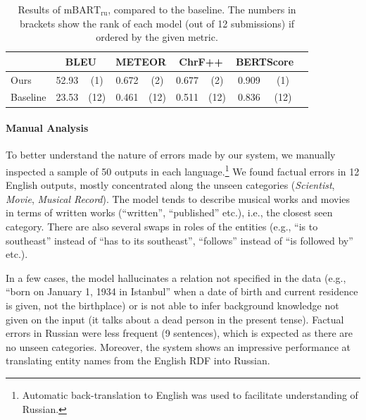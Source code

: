 \begin{table}[t]
    \footnotesize\centering
    \begin{tabular}{llcccccccc}\toprule
                 & \multicolumn{2}{c}{\bf BLEU} & \multicolumn{2}{c}{\bf METEOR} & \multicolumn{2}{c}{\bf ChrF++} & \multicolumn{2}{c}{\bf BERTScore}                               \\\midrule
        Ours     & 52.93                        & (1)                            & 0.672                          & (2)                               & 0.677 & (2)  & 0.909 & (1)  \\
        Baseline & 23.53                        & (12)                           & 0.461                          & (12)                              & 0.511 & (12) & 0.836 & (12) \\\bottomrule
    \end{tabular}
    \caption{Results of $\text{mBART}_{\text{ru}}$, compared to the baseline. The numbers in brackets show the rank of each model (out of 12 submissions) if ordered by the given metric.}
    \label{tab:mbart:results-ru}
\end{table}

\paragraph{Manual Analysis}
To better understand the nature of errors made by our system, we manually inspected a sample of 50 outputs in each language.\footnote{Automatic back-translation to English was used to facilitate understanding of Russian.} We found factual errors in 12 English outputs, mostly concentrated along the unseen categories (\emph{Scientist}, \emph{Movie}, \emph{Musical Record}). The model tends to describe musical works and movies in terms of written works (“written”, “published” etc.), i.e., the closest seen category. There are also several swaps in roles of the entities (e.g., “is to southeast” instead of “has to its southeast”, “follows” instead of “is followed by” etc.).

In a few cases, the model hallucinates a relation not specified in the data (e.g., “born on January 1, 1934 in Istanbul” when a date of birth and current residence is given, not the birthplace) or is not able to infer background knowledge not given on the input (it talks about a dead person in the present tense).
Factual errors in Russian were less frequent (9 sentences), which is expected as there are no unseen categories. Moreover, the system shows an impressive performance at translating entity names from the English RDF into Russian.

